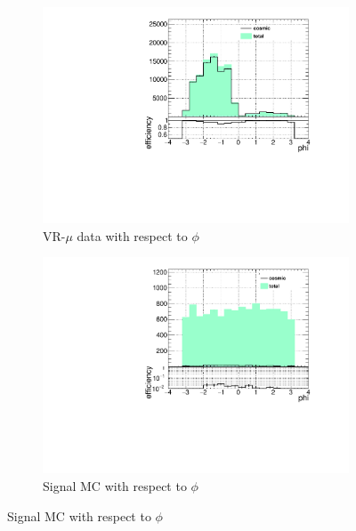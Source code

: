 \begin{figure}[!ht]
  \ContinuedFloat
  \centering
  \begin{subfigure}[b]{0.4\textwidth}
  	\includegraphics[width=\textwidth]{figures/cosmics/wider_tag_ratio_phi.pdf}
  	\caption{VR-$\mu$ data with respect to $\phi$}
  \end{subfigure}
  \begin{subfigure}[b]{0.4\textwidth}
 	\includegraphics[width=\textwidth]{figures/cosmics/mc_300_ratio_phi.pdf}
  	\caption{Signal \ac{MC} with respect to $\phi$}
  \end{subfigure}


\end{figure}
